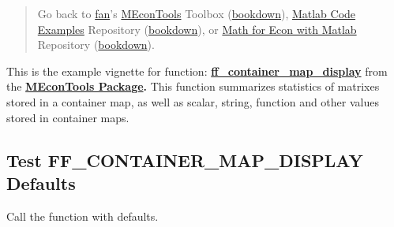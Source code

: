 \documentclass[
]{book}
\begin{document}
\begin{quote}
Go back to \href{http://fanwangecon.github.io/}{fan}'s \href{https://fanwangecon.github.io/MEconTools/}{MEconTools} Toolbox (\href{https://fanwangecon.github.io/MEconTools/bookdown}{bookdown}), \href{https://fanwangecon.github.io/M4Econ/}{Matlab Code Examples} Repository (\href{https://fanwangecon.github.io/M4Econ/bookdown}{bookdown}), or \href{https://fanwangecon.github.io/Math4Econ/}{Math for Econ with Matlab} Repository (\href{https://fanwangecon.github.io/Math4Econ/bookdown}{bookdown}).
\end{quote}

This is the example vignette for function:
\href{https://github.com/FanWangEcon/MEconTools/blob/master/MEconTools/tools/ff_container_map_display.m}{\textbf{ff\_container\_map\_display}}
from the \href{https://fanwangecon.github.io/MEconTools/}{\textbf{MEconTools
Package}}\textbf{.} This function
summarizes statistics of matrixes stored in a container map, as well as
scalar, string, function and other values stored in container maps.

\hypertarget{test-ff_container_map_display-defaults}{%
\subsection{Test FF\_CONTAINER\_MAP\_DISPLAY Defaults}\label{test-ff_container_map_display-defaults}}

Call the function with defaults.
\end{document}
